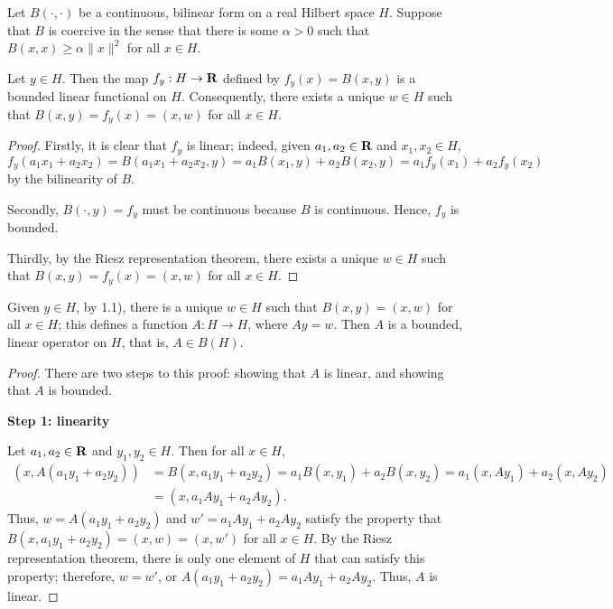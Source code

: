 \documentclass{homework}
\begin{document}
	\maketitle
	
	\question
	Let $B(\cdot,\cdot)$ be a continuous, bilinear form on a real Hilbert space $H$. Suppose that $B$ is coercive in the sense that there is some $\alpha > 0$ such that $B(x,x) \ge \alpha\lVert x\rVert^2$ for all $x \in H$.
	\begin{arabicparts}
		\questionpart 
		Let $y \in H$. Then the map $f_y : H \to \textnormal{\bf R}$ defined by $f_y(x) = B(x,y)$ is a bounded linear functional on $H$. Consequently, there exists a unique $w \in H$ such that $B(x,y) = f_y(x) = (x,w)$ for all $x \in H$.
		\begin{proof}
			Firstly, it is clear that $f_y$ is linear; indeed, given $a_1, a_2 \in \textnormal{\bf R}$ and $x_1, x_2 \in H$,
			\begin{equation}
				f_y(a_1x_1+a_2x_2) = B(a_1x_1+a_2x_2,y) = a_1B(x_1,y) + a_2B(x_2,y) = a_1f_y(x_1) + a_2f_y(x_2)
			\end{equation}
			by the bilinearity of $B$.
			
			Secondly, $B(\cdot, y)=f_y$ must be continuous because $B$ is continuous. Hence, $f_y$ is bounded.
			
			Thirdly, by the Riesz representation theorem, there exists a unique $w \in H$ such that $B(x,y) = f_y(x) = (x,w)$ for all $x \in H$.
		\end{proof}
		
		\questionpart 
		Given $y \in H$, by 1.1), there is a unique $w\in H$ such that $B(x,y) = (x,w)$ for all $x \in H$; this defines a function $A: H \to H$, where $Ay = w$. Then $A$ is a bounded, linear operator on $H$, that is, $A \in B(H)$.
		\begin{proof}
			There are two steps to this proof: showing that $A$ is linear, and showing that $A$ is bounded.
			
			\textbf{Step 1: linearity}
			
			Let $a_1, a_2 \in \textnormal{\bf R}$ and $y_1, y_2 \in H$. Then for all $x \in H$,
			\begin{equation}
			\begin{aligned}
				(x, A(a_1y_1+a_2y_2)) &= B(x,a_1y_1 + a_2y_2) = a_1B(x,y_1) + a_2B(x,y_2) = a_1(x,Ay_1) + a_2(x,Ay_2) \\
				&= (x, a_1Ay_1 + a_2Ay_2).
			\end{aligned}
			\end{equation}
			Thus, $w=A(a_1y_1+a_2y_2)$ and $w' = a_1Ay_1 + a_2Ay_2$ satisfy the property that $B(x,a_1y_1+a_2y_2) = (x,w) = (x,w')$ for all $x \in H$. By the Riesz representation theorem, there is only one element of $H$ that can satisfy this property; therefore, $w=w'$, or $A(a_1y_1 + a_2y_2) = a_1Ay_1 + a_2Ay_2$. Thus, $A$ is linear.
			

\end{proof}
\end{arabicparts}
\end{document}

